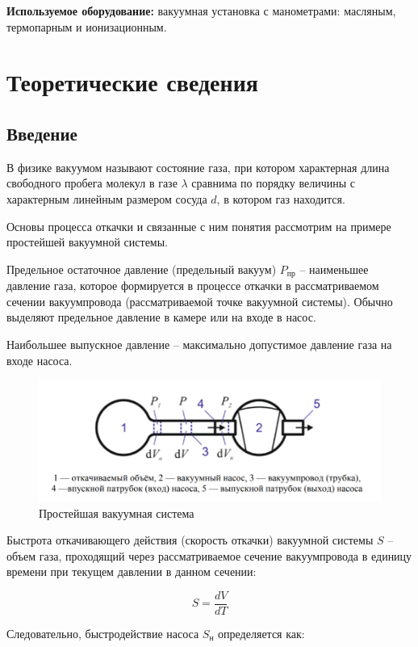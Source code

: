 \documentclass[a4paper, 12pt]{article} %
\begin{document}
\textbf{Используемое оборудование:} вакуумная установка с манометрами: масляным, термопарным и ионизационным.

\section{Теоретические сведения}
\subsection{Введение}

В физике вакуумом называют состояние газа, при котором характерная длина свободного пробега молекул в газе $\lambda$ сравнима по порядку
величины с характерным линейным размером сосуда $d$, в котором газ
находится.

Основы процесса откачки и связанные с ним понятия рассмотрим
на примере простейшей вакуумной системы.

Предельное остаточное давление (предельный вакуум) $P_{\text{пр}}$ -- наименьшее давление газа, которое формируется в процессе откачки в рассматриваемом сечении вакуумпровода (рассматриваемой точке вакуумной системы). Обычно выделяют предельное давление в
камере или на входе в насос.

Наибольшее выпускное давление -- максимально допустимое давление газа на входе насоса.

\begin{figure}[h]
    \centering
    \includegraphics[width = 11 cm]{1}
    \caption{Простейшая вакуумная система}
    \label{fig:vac}
\end{figure}

Быстрота откачивающего действия (скорость откачки) вакуумной системы $S$ -- объем газа, проходящий через рассматриваемое сечение вакуумпровода в единицу времени при текущем давлении
в данном сечении:
 
\begin{equation}
    S = \frac{dV}{dT}
\end{equation}

Следовательно, быстродействие насоса $S_{\text{н}}$ определяется как:
\end{document}

